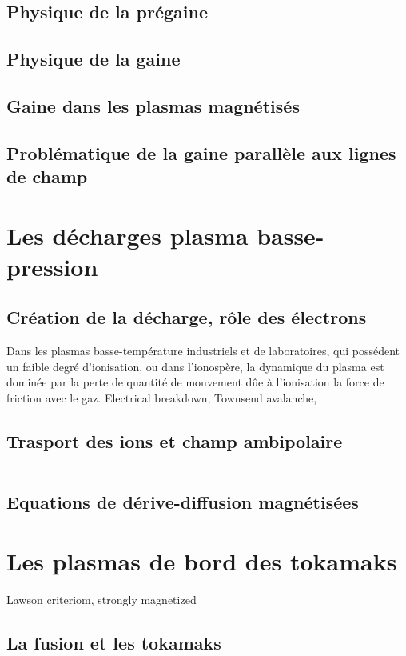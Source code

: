 			\subsection{Physique de la prégaine}
			\subsection{Physique de la gaine}
			\subsection{Gaine dans les plasmas magnétisés}
			\subsection{Problématique de la gaine parallèle aux lignes de champ}
	
	 \section{Les décharges plasma basse-pression}
		\subsection{Création de la décharge, rôle des électrons}
		Dans les plasmas basse-température industriels et de laboratoires, qui possédent
			un faible degré d'ionisation, ou dans l'ionospère, la dynamique du plasma est dominée par
			la perte de quantité de mouvement dûe à l'ionisation la force de friction avec le gaz.
		Electrical breakdown, Townsend avalanche, 
		\subsection{Trasport des ions et champ ambipolaire}
		\begin{equation}
			\label{derivediffusion}
		\end{equation}
		\subsection{Equations de dérive-diffusion magnétisées}
		
	\section{Les plasmas de bord des tokamaks}
		Lawson criteriom, strongly magnetized
		\subsection{La fusion et les tokamaks}
